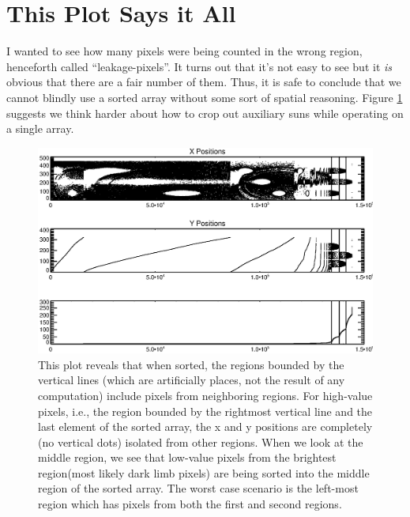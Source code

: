 \documentclass[10pt]{article}
\begin{document}

\section{This Plot Says it All} %
\label{sec:this_plot_says_it_all}

    I wanted to see how many pixels were being counted in the wrong region, henceforth called ``leakage-pixels''. It turns out that it's not easy to see but it \emph{is} obvious that there are a fair number of them. Thus, it is safe to conclude that we cannot blindly use a sorted array without some sort of spatial reasoning. Figure \ref{saysitall} suggests we think harder about how to crop out auxiliary suns while operating on a single array.

\begin{figure}[!ht]
    \centering
    \includegraphics[width=.9\textwidth]{plots_tables_images/saysitall.eps}
    \caption{This plot reveals that when sorted, the regions bounded by the vertical lines (which are artificially places, not the result of any computation) include pixels from neighboring regions. For high-value pixels, i.e., the region bounded by the rightmost vertical line and the last element of the sorted array, the x and y positions are completely (no vertical dots) isolated from other regions. When we look at the middle region, we see that low-value pixels from the brightest region(most likely dark limb pixels) are being sorted into the middle region of the sorted array. The worst case scenario is the left-most region which has pixels from both the first and second regions.}
    \label{saysitall}
\end{figure}

\end{document}
